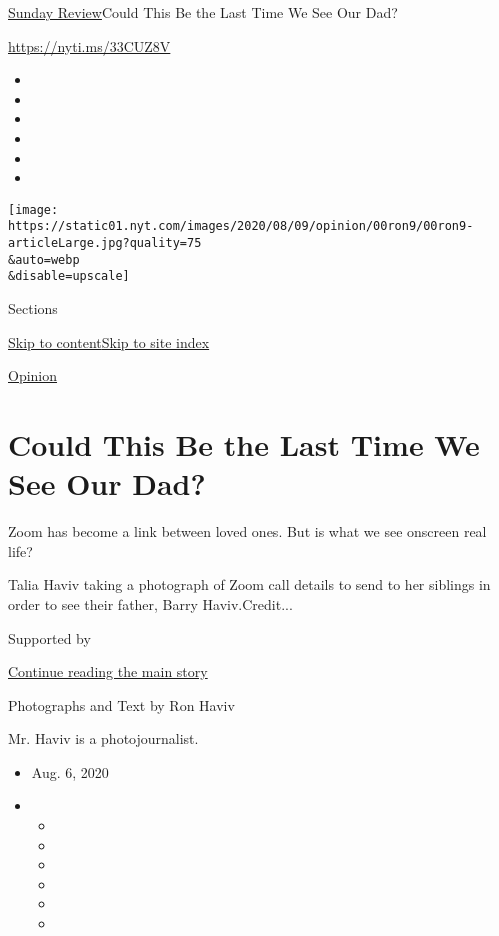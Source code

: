 \href{/section/opinion/sunday}{Sunday Review}\textbar{}Could This Be the
Last Time We See Our Dad?

\href{https://nyti.ms/33CUZ8V}{https://nyti.ms/33CUZ8V}

\begin{itemize}
\item
\item
\item
\item
\item
\item
\end{itemize}

\texttt{[image: https://static01.nyt.com/images/2020/08/09/opinion/00ron9/00ron9-articleLarge.jpg?quality=75\\\&auto=webp\\\&disable=upscale]}

Sections

\protect\hyperlink{site-content}{Skip to
content}\protect\hyperlink{site-index}{Skip to site index}

\href{/section/opinion}{Opinion}

\hypertarget{could-this-be-the-last-time-we-see-our-dad}{%
\section{Could This Be the Last Time We See Our
Dad?}\label{could-this-be-the-last-time-we-see-our-dad}}

Zoom has become a link between loved ones. But is what we see onscreen
real life?

Talia Haviv taking a photograph of Zoom call details to send to her
siblings in order to see their father, Barry Haviv.Credit...

Supported by

\protect\hyperlink{after-sponsor}{Continue reading the main story}

Photographs and Text by Ron Haviv

Mr. Haviv is a photojournalist.

\begin{itemize}
\item
  Aug. 6, 2020
\item
  \begin{itemize}
  \item
  \item
  \item
  \item
  \item
  \item
  \end{itemize}
\end{itemize}

